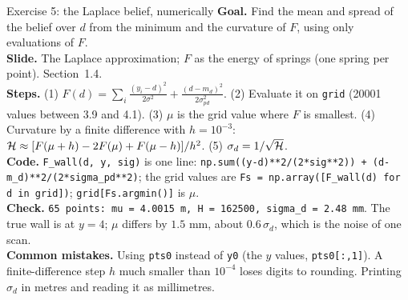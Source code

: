 \documentclass[11pt]{article}
\begin{document}
\begin{labhelp}{Exercise 5: the Laplace belief, numerically}
\textbf{Goal.} Find the mean and spread of the belief over $d$ from the minimum and the curvature of $F$, using only evaluations of $F$.\\
\textbf{Slide.} The Laplace approximation; $F$ as the energy of springs (one spring per point). Section~1.4.\\
\textbf{Steps.} (1) $F(d)=\sum_i\frac{(y_i-d)^2}{2\sigma^2}+\frac{(d-m_d)^2}{2\sigma_{pd}^2}$. (2) Evaluate it on \texttt{grid} (20001 values between 3.9 and 4.1). (3) $\mu$ is the grid value where $F$ is smallest. (4) Curvature by a finite difference with $h=10^{-3}$: $\mathcal{H}\approx[F(\mu+h)-2F(\mu)+F(\mu-h)]/h^2$. (5) $\sigma_d=1/\sqrt{\mathcal{H}}$.\\
\textbf{Code.} \texttt{F\_wall(d, y, sig)} is one line: \texttt{np.sum((y-d)**2/(2*sig**2)) + (d-m\_d)**2/(2*sigma\_pd**2)}; the grid values are \texttt{Fs = np.array([F\_wall(d) for d in grid])}; \texttt{grid[Fs.argmin()]} is $\mu$.\\
\textbf{Check.} \texttt{65 points: mu = 4.0015 m, H = 162500, sigma\_d = 2.48 mm}. The true wall is at $y=4$; $\mu$ differs by $1.5$ mm, about $0.6\,\sigma_d$, which is the noise of one scan.\\
\textbf{Common mistakes.} Using \texttt{pts0} instead of \texttt{y0} (the $y$ values, \texttt{pts0[:,1]}). A finite-difference step $h$ much smaller than $10^{-4}$ loses digits to rounding. Printing $\sigma_d$ in metres and reading it as millimetres.
\end{labhelp}
\end{document}
